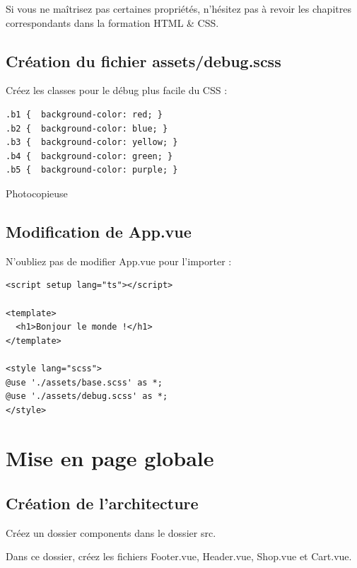 Si vous ne maîtrisez pas certaines propriétés, n'hésitez pas à revoir les chapitres correspondants dans la formation HTML \& CSS.

\subsection{Création du fichier assets/debug.scss}
Créez les classes pour le débug plus facile du CSS :
\begin{verbatim}
.b1 {  background-color: red; }
.b2 {  background-color: blue; }
.b3 {  background-color: yellow; }
.b4 {  background-color: green; }
.b5 {  background-color: purple; }
\end{verbatim}

Photocopieuse
\subsection{Modification de App.vue}
N'oubliez pas de modifier App.vue pour l'importer :
\begin{verbatim}
<script setup lang="ts"></script>

<template>
  <h1>Bonjour le monde !</h1>
</template>

<style lang="scss">
@use './assets/base.scss' as *;
@use './assets/debug.scss' as *;
</style>
\end{verbatim}



\section{Mise en page globale}
\subsection{Création de l'architecture}
Créez un dossier {\color{monOrange}components} dans le dossier {\color{monOrange}src}.

Dans ce dossier, créez les fichiers {\color{monOrange}Footer.vue, Header.vue, Shop.vue} et {\color{monOrange}Cart.vue}.


